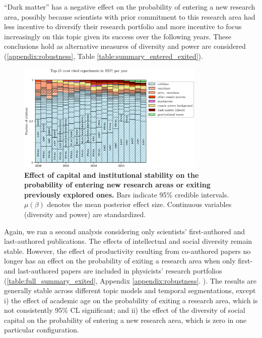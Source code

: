 \documentclass{article}
\begin{document}
``Dark matter'' has a negative effect on the probability of entering a new research area, possibly because scientists with prior commitment to this research area had less incentive to diversify their research portfolio and more incentive to focus increasingly on this topic given its success over the following years. These conclusions hold as alternative measures of diversity and power are considered (\ref{appendix:robustness}, Table \ref{table:summary_entered_exited}).

\begin{figure}[h]
    \centering
    \includegraphics[width=0.8\textwidth]{Fig8}
    \caption{\textbf{Effect of capital and institutional stability on the probability of entering new research areas or exiting previously explored ones.} Bars indicate 95\% credible intervals. $\mu(\beta)$ denotes the mean posterior effect size. Continuous variables (diversity and power) are standardized.}
    \label{fig:diversification_score_effect}
\end{figure}

Again, we ran a second analysis considering only scientists' first-authored and last-authored publications. The effects of intellectual and social diversity remain stable. However, the effect of productivity resulting from co-authored papers no longer has an effect on the probability of exiting a research area when only first- and last-authored papers are included in physicists' research portfolios (\ref{table:full_summary_exited}, Appendix \ref{appendix:robustness}. ). The results are generally stable across different topic models and temporal segmentations, except i) the effect of academic age on the probability of exiting a research area, which is not consistently 95\% CL significant; and ii) the effect of the diversity of social capital on the probability of entering a new research area, which is zero in one particular configuration.
\end{document}
